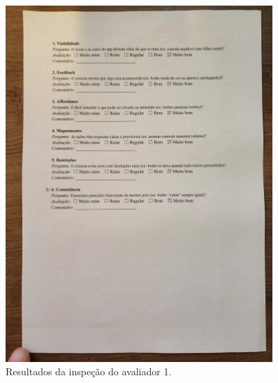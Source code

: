 \begin{figure}[H]
    \includegraphics[width=0.9\textwidth]{sections/appendix/resultados_inspecao_usabilidade/1 (2).jpg}
    \caption{Resultados da inspeção do avaliador 1.}
\end{figure}


